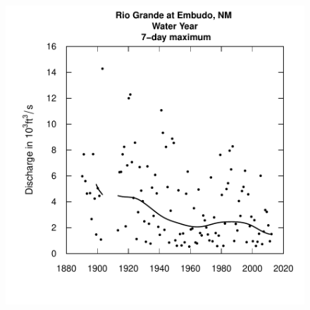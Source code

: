 \documentclass[a4paper,11pt]{article}
\begin{document}
\begin{figure}[htbp]
  \begin{minipage}[h]{0.5\linewidth}
    \begin{center}

\includegraphics{EGRET-figplotFlowSingle}
    \label{fig:plotFlowSingle}
    \end{center}
  \end{minipage}
  \begin{minipage}[h]{0.5\linewidth}
    \begin{center}



\end{center}
\end{minipage}
\end{figure}
\end{document}
